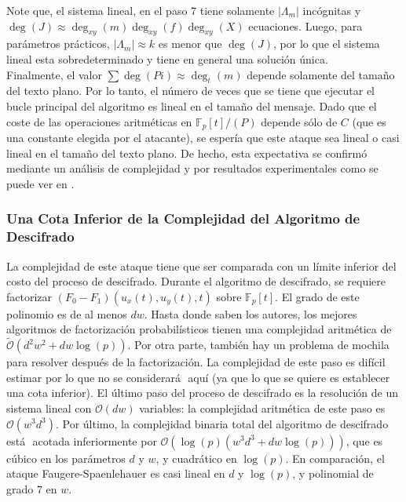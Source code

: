 \documentclass[11pt]{article}
\newcommand{\Fp}{\mathbb{F}_p}
\numberwithin{equation}{section} %
\numberwithin{figure}{section} %
\numberwithin{table}{section} %
\begin{document}
				Note que, el sistema lineal, en el paso 7 tiene solamente $|\Lambda_m|$ inc\'ognitas y $\deg(J)\approx\deg_{xy}(m)\deg_{xy}(f)\deg_{xy}(X)$ ecuaciones. Luego, para par\'ametros pr\'acticos, $|\Lambda_m|\approx k$ es menor que $\deg(J)$, por lo que el sistema lineal esta sobredeterminado y tiene en general una soluci\'on \'unica. \\

				Finalmente, el valor $\sum\deg(Pi)\approx\deg_t(m)$ depende solamente del tamaño del texto plano. Por lo tanto, el n\'umero de veces que se tiene que ejecutar el bucle principal del algoritmo  es lineal en el tamaño del mensaje. Dado que el coste de las operaciones aritm\'eticas en $\Fp[t] / (P)$ depende s\'olo de $C$ (que es una constante elegida por el atacante), se esper\'ia que este ataque sea lineal o casi lineal en el tamaño del texto plano. De hecho, esta expectativa se confirm\'o mediante un an\'alisis de complejidad y por resultados experimentales como se puede ver en \cite{FS}.

			\subsubsection{Una Cota Inferior de la Complejidad del Algoritmo de Descifrado}
			\label{421CompFS}

				La complejidad de este ataque tiene que ser comparada con un l\'imite inferior del costo del proceso de descifrado. Durante el algoritmo de descifrado, se requiere factorizar $(F_0 - F_1) (u_x(t),u_y(t), t)$ sobre $\Fp[t]$. El grado de este polinomio es de al menos $dw$. Hasta donde saben los autores, los mejores algoritmos de factorizaci\'on probabil\'isticos tienen una complejidad aritm\'etica de $\tilde{\mathcal{O}}(d^2w^2 +dw \log (p))$. Por otra parte, tambi\'en hay un problema de mochila para resolver despu\'es de la factorizaci\'on. La complejidad de este paso es dif\'icil estimar por lo que no se considerar\'a$\text{ }$aqu\'i (ya que lo que se quiere es establecer una cota inferior). El \'ultimo paso del proceso de descifrado es la resoluci\'on de un sistema lineal con $\mathcal{O}(dw)$ variables: la complejidad aritm\'etica de este paso es $\mathcal{O}(w^3 d^3)$. Por \'ultimo, la complejidad binaria total del algoritmo de descifrado est\'a$\text{ }$acotada inferiormente por $\mathcal{O}(\log(p) (w^3 d^3 + dw\log(p)))$, que es c\'ubico en los par\'ametros $d$ y $w$, y cuadr\'atico en $\log (p)$. En comparaci\'on, el ataque Faugere-Spaenlehauer es casi lineal en $d$ y $\log (p)$, y polinomial de grado $7$ en $w$.
\end{document}
